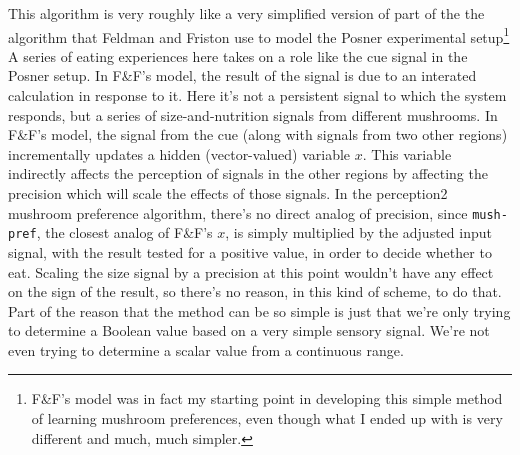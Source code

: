 \documentclass[12pt]{article}
\newcommand{\fn}[1]{\footnote{#1}}
\begin{document}
This algorithm is very roughly like a very simplified version of part of
the the algorithm that Feldman and Friston \citeyearpar[p.\
9]{FeldmanFriston:AttentionUncertainty} use to model the Posner
experimental setup\fn{
    F\&F's model was in fact my starting point in developing this simple
    method of learning mushroom preferences, even though what I ended up
    with is very different and much, much simpler.}
A series of eating experiences here takes on a role like the cue signal
in the Posner setup.  In F\&F's model, the result of the signal is due
to an interated calculation in response to it.  Here it's not a
persistent signal to which the system responds, but a series of
size-and-nutrition signals from different mushrooms. In F\&F's model,
the signal from the cue (along with signals from two other regions)
incrementally updates a hidden (vector-valued) variable $x$.  This
variable indirectly affects the perception of signals in the other regions by
affecting the precision which will scale the effects of those signals.  In
the perception2 mushroom preference algorithm, there's no direct analog
of precision, since {\tt mush-pref}, the closest analog of F\&F's $x$, is simply
multiplied by the adjusted input signal, with the result tested for a 
positive value, in order to decide whether to eat.  Scaling the size signal by
a precision at this point wouldn't have any effect on the sign of the result, so
there's no reason, in this kind of scheme, to do that.  Part of the reason
that the method can be so simple is just that we're only trying to determine
a Boolean value based on a very simple sensory signal.  We're not even trying
to determine a scalar value from a continuous range.



\end{document}
